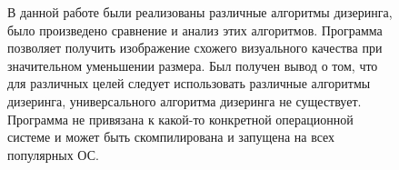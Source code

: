 \Conclusion %

\begin{figure}
В данной работе были реализованы различные алгоритмы дизеринга, было произведено сравнение и анализ этих алгоритмов. Программа позволяет получить изображение схожего визуального качества при значительном уменьшении размера. Был получен вывод о том, что для различных целей следует использовать различные алгоритмы дизеринга, универсального алгоритма дизеринга не существует. Программа не привязана к какой-то конкретной
операционной системе и может быть скомпилирована и запущена на
всех популярных ОС.
\end{figure}
